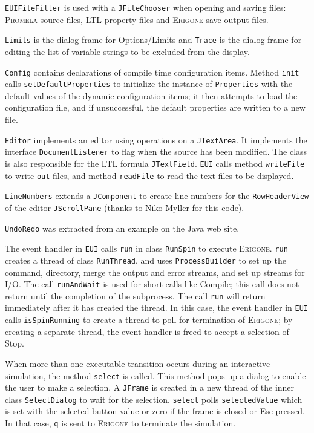 \documentclass[11pt]{article}
\newcommand{\eri}{\textsc{Erigone}}
\newcommand{\prm}{\textsc{Promela}}
\newcommand{\p}[1]{\texttt{#1}}
\newcommand{\bu}[1]{\textsf{#1}}
\begin{document}
\p{EUIFileFilter} is used with a \p{JFileChooser} when opening and
saving files: \prm{} source files, LTL property files and \eri{} save
output files.

\p{Limits} is the dialog frame for \bu{Options/Limits} and \p{Trace} is
the dialog frame for editing the list of variable strings to be excluded
from the display.

\p{Config} contains declarations of compile time configuration items.
Method \p{init} calls \p{set\-Default\-Properties} to initialize the
instance of \p{Properties} with the default values of the dynamic
configuration items; it then attempts to load the configuration file,
and if unsuccessful, the default properties are written to a new file.

\p{Editor} implements an editor using operations on a \p{JTextArea}. It
implements the interface \p{Document\-Listener} to flag when the source
has been modified. The class is also responsible for the LTL formula
\p{JTextField}. \p{EUI} calls method \p{writeFile} to write \p{out}
files, and method \p{readFile} to read the text files to be displayed.

\p{LineNumbers} extends a \p{JComponent} to create line numbers for the
\p{RowHeaderView} of the editor \p{JScrollPane} (thanks to Niko Myller
for this code).

\p{UndoRedo} was extracted from an example on the Java web site.

The event handler in \p{EUI} calls \p{run} in class \p{RunSpin} to
execute \eri{}. \p{run} creates a thread of class \p{RunThread}, and
uses \p{ProcessBuilder} to set up the command, directory, merge the
output and error streams, and set up streams for I/O. The call
\p{runAndWait} is used for short calls like \bu{Compile}; this call does
not return until the completion of the subprocess. The call \p{run} will
return immediately after it has created the thread. In this case, the
event handler in \p{EUI} calls \p{isSpinRunning} to create a thread to
poll for termination of \eri{}; by creating a separate thread, the event
handler is freed to accept a selection of \bu{Stop}.

When more than one executable transition occurs during an interactive
simulation, the method \p{select} is called. This method pops up a
dialog to enable the user to make a selection. A \p{JFrame} is created
in a new thread of the inner class \p{SelectDialog} to wait for the
selection. \p{select} polls \p{selectedValue} which is set with the
selected button value or zero if the frame is closed or \bu{Esc}
pressed. In that case, \p{q} is sent to \eri{} to terminate the
simulation.
\end{document}
